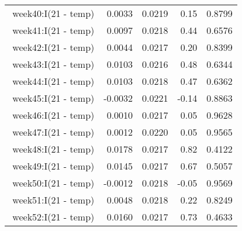 \begin{table}[ht]
\begin{tabular}{rrrrr}
$$  week40:I(21 - temp) & 0.0033 & 0.0219 & 0.15 & 0.8799 \\ 
  week41:I(21 - temp) & 0.0097 & 0.0218 & 0.44 & 0.6576 \\ 
  week42:I(21 - temp) & 0.0044 & 0.0217 & 0.20 & 0.8399 \\ 
  week43:I(21 - temp) & 0.0103 & 0.0216 & 0.48 & 0.6344 \\ 
  week44:I(21 - temp) & 0.0103 & 0.0218 & 0.47 & 0.6362 \\ 
  week45:I(21 - temp) & -0.0032 & 0.0221 & -0.14 & 0.8863 \\ 
  week46:I(21 - temp) & 0.0010 & 0.0217 & 0.05 & 0.9628 \\ 
  week47:I(21 - temp) & 0.0012 & 0.0220 & 0.05 & 0.9565 \\ 
  week48:I(21 - temp) & 0.0178 & 0.0217 & 0.82 & 0.4122 \\ 
  week49:I(21 - temp) & 0.0145 & 0.0217 & 0.67 & 0.5057 \\ 
  week50:I(21 - temp) & -0.0012 & 0.0218 & -0.05 & 0.9569 \\ 
  week51:I(21 - temp) & 0.0048 & 0.0218 & 0.22 & 0.8249 \\ 
  week52:I(21 - temp) & 0.0160 & 0.0217 & 0.73 & 0.4633 \\ 
   \hline
\end{tabular}
\end{table}
